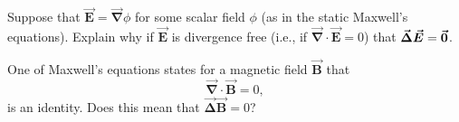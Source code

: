 \documentclass[12pt]{article} %
\newcommand{\grad}{\boldsymbol{\vec{\nabla}}}
\newcommand{\veclaplace}{\boldsymbol{\vec{\Delta}}}
\newcommand{\vecfieldB}{\boldsymbol{\vec{B}}}
\newcommand{\vecfieldE}{\boldsymbol{\vec{E}}}
\begin{document}
\begin{problem}
    Suppose that $\vecfieldE = \grad \phi$ for some scalar field $\phi$ (as in the static Maxwell's equations).  Explain why if $\vecfieldE$ is divergence free (i.e., if $\grad \cdot \vecfieldE=0$) that $\veclaplace \vecfieldE = \zerovec$.
\end{problem}

\begin{problem}
    One of Maxwell's equations states for a magnetic field $\vecfieldB$ that
    \[
    \grad \cdot \vecfieldB = 0,
    \]
    is an identity.  Does this mean that $\veclaplace \vecfieldB = 0$? 
\end{problem}
\end{document}
